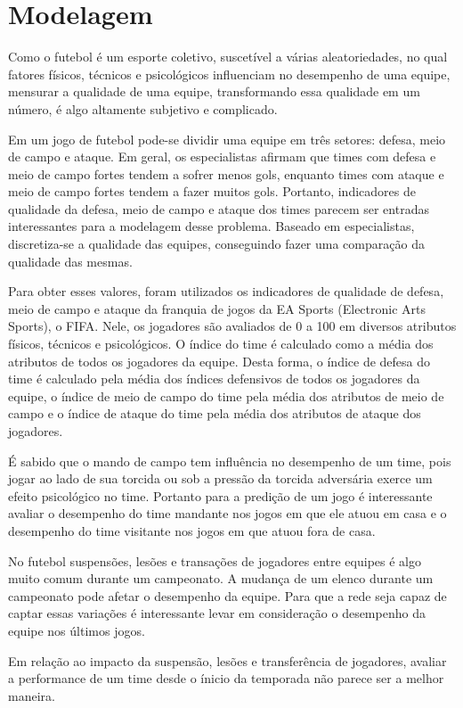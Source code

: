 \documentclass{article}
\begin{document}
\section{Modelagem}

Como o futebol é um esporte coletivo, suscetível a várias aleatoriedades, no
qual fatores físicos, técnicos e psicológicos influenciam no desempenho de uma equipe, mensurar a qualidade de uma equipe, transformando essa qualidade em um número, é algo altamente subjetivo e complicado.

Em um jogo de futebol pode-se dividir uma equipe em três setores: defesa, meio
de campo e ataque. Em geral, os especialistas afirmam que times com defesa e meio de campo fortes tendem a sofrer menos gols, enquanto times com ataque e meio de campo fortes tendem a fazer muitos gols. Portanto, indicadores de qualidade da defesa, meio de campo e ataque dos times parecem ser entradas interessantes para a modelagem desse problema. Baseado em especialistas, discretiza-se a qualidade das equipes, conseguindo fazer uma comparação da qualidade das mesmas.

Para obter esses valores, foram utilizados os indicadores de qualidade de defesa,
meio de campo e ataque da franquia de jogos da EA Sports (Electronic Arts Sports), o FIFA. Nele, os jogadores são avaliados de 0 a 100 em diversos atributos
físicos, técnicos e psicológicos. O índice do time é calculado como a média dos atributos de todos os jogadores da equipe. Desta forma, o índice de defesa do time é calculado pela média dos índices defensivos de todos os jogadores da equipe, o índice de meio de campo do time pela média dos atributos de meio de campo e o índice de ataque do time pela média dos atributos de ataque dos jogadores.

É sabido que o mando de campo tem influência no desempenho de um time,
pois jogar ao lado de sua torcida ou sob a pressão da torcida adversária exerce um
efeito psicológico no time. Portanto para a predição de um jogo é interessante avaliar o desempenho do time mandante nos jogos em que ele atuou em casa e o desempenho do time visitante nos jogos em que atuou fora de casa.

No futebol suspensões, lesões e transações de jogadores entre equipes é algo
muito comum durante um campeonato. A mudança de um elenco durante um campeonato pode afetar o desempenho da equipe. Para que a rede seja capaz de captar essas variações é interessante levar em consideração o desempenho da equipe nos últimos
jogos.

Em relação ao impacto da suspensão, lesões e transferência de jogadores, avaliar a performance de um time desde o ínicio da temporada não parece ser a melhor maneira.
\end{document}
